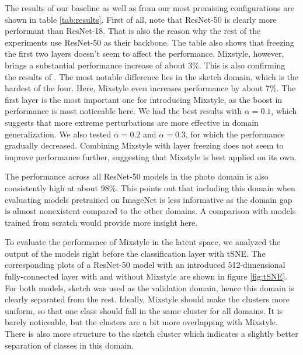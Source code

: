 The results of our baseline as well as from our most promising configurations are shown in table \ref{tab:results}. First of all, note that ResNet-50 is clearly more performant than ResNet-18. That is also the reason why the rest of the experiments use ResNet-50 as their backbone. The table also shows that freezing the first two layers doesn't seem to affect the performance. Mixstyle, however, brings a substantial performance increase of about 3\%. This is also confirming the results of \cite{mixstyle_ref}. The most notable difference lies in the sketch domain, which is the hardest of the four. Here, Mixstyle even increases performance by about 7\%. The first layer is the most important one for introducing Mixstyle, as the boost in performance is most noticeable here. We had the best results with $\alpha = 0.1$, which suggests that more extreme perturbations are more effective in domain generalization. We also tested $\alpha = 0.2$ and $\alpha = 0.3$, for which the performance gradually decreased. Combining Mixstyle with layer freezing does not seem to improve performance further, suggesting that Mixstyle is best applied on its own.

The performance across all ResNet-50 models in the photo domain is also consistently high at about 98\%. This points out that including this domain when evaluating models pretrained on ImageNet is less informative as the domain gap is almost nonexistent compared to the other domains. A comparison with models trained from scratch would provide more insight here.

To evaluate the performance of Mixstyle in the latent space, we analyzed the output of the models right before the classification layer with tSNE. The corresponding plots of a ResNet-50 model with an introduced 512-dimensional fully-connected layer with and without Mixstyle are shown in figure \ref{fig:tSNE}. For both models, sketch was used as the validation domain, hence this domain is clearly separated from the rest. Ideally, Mixstyle should make the clusters more uniform, so that one class should fall in the same cluster for all domains. It is barely noticeable, but the clusters are a bit more overlapping with Mixstyle. There is also more structure to the sketch cluster which indicates a slightly better separation of classes in this domain.

